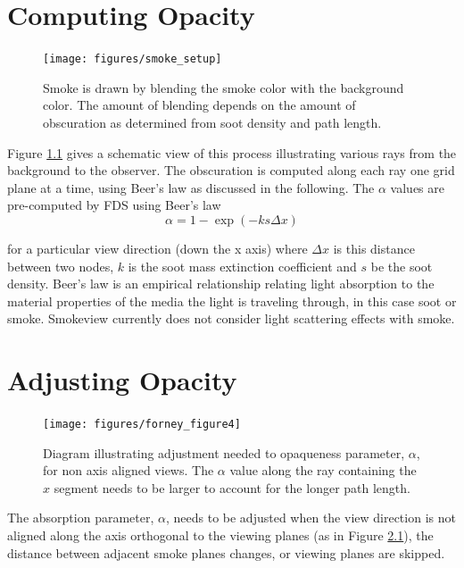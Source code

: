 \documentclass[11pt,twoside]{book}
\begin{document}

\chapter{Computing Opacity}
\begin{figure}[t]
\begin{center}
\texttt{[image: figures/smoke\_setup]}
\end{center}
\caption {Smoke is drawn by blending the smoke color with the
background color.  The amount of blending depends on the amount of
obscuration as determined from soot density and path length.}
\label{figsmokesetup}
\end{figure}

Figure \ref{figsmokesetup} gives a schematic view of this process illustrating various rays from the background to the observer.  The obscuration is computed along each ray one grid plane at a time, using Beer's law as discussed in the following.  The $\alpha$ values are pre-computed by FDS using Beer's
law\cite{Siegel:2001}
\begin{equation}
\alpha=1-\exp(-ks\Delta x) \label{eq:alpha}
\end{equation}

\noindent for a particular view direction (down the x axis) where $\Delta x$
is this distance between two nodes, $k$ is the soot mass
extinction coefficient and $s$ be the soot density. Beer's law is
an empirical relationship relating light absorption to the
material properties of the media the light is traveling through,
in this case soot or smoke.  Smokeview currently does not consider
light scattering effects with smoke.

\chapter{Adjusting Opacity}

\begin{figure}[t]
\centerline{\texttt{[image: figures/forney\_figure4]}}
\caption [Diagram illustrating the adjustment needed to opaqueness
parameter, $\alpha$, for non axis aligned views.] { Diagram
illustrating adjustment needed to opaqueness parameter, $\alpha$,
for non axis aligned views. The $\alpha$ value along the ray
containing the $\hat{x}$ segment needs to be larger to account for
the longer path length. } \label{figray}
\end{figure}
The absorption parameter, $\alpha$, needs to be adjusted when the
view direction is not aligned along the axis orthogonal to the
viewing planes (as in Figure \ref{figray}), the distance between
adjacent smoke planes changes, or viewing planes are skipped.
\end{document}
